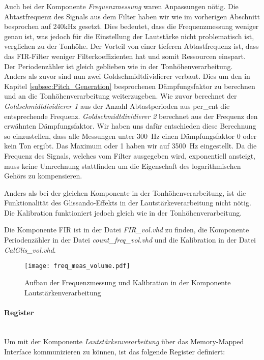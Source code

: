 Auch bei der Komponente \textit{Frequenzmessung} waren Anpassungen nötig. 
Die Abtastfrequenz des Signals aus dem Filter haben wir wie im vorherigen Abschnitt besprochen auf 240kHz gesetzt. Dies bedeutet, dass die Frequenzmessung weniger genau ist, was jedoch für die Einstellung der Lautstärke nicht problematisch ist, verglichen zu der Tonhöhe. Der Vorteil von einer tieferen Abtastfrequenz ist, dass das FIR-Filter weniger Filterkoeffizienten hat und somit Ressourcen einspart.\\
Der Periodenzähler ist gleich geblieben wie in der Tonhöhenverarbeitung.\\
Anders als zuvor sind nun zwei Goldschmidtdividierer verbaut. Dies um den in Kapitel \ref{subsec:Pitch_Generation} besprochenen Dämpfungsfaktor zu berechnen und an die Tonhöhenverarbeitung weiterzugeben. Wie zuvor berechnet der \textit{Goldschmidtdividierer 1} aus der Anzahl Abtastperioden aus per\_cnt die entsprechende Frequenz. \textit{Goldschmidtdividierer 2} berechnet aus der Frequenz den erwähnten Dämpfungsfaktor. Wir haben uns dafür entschieden diese Berechnung so einzustellen, dass alle Messungen unter \SI{300}{Hz} einen Dämpfungsfaktor 0 oder kein Ton ergibt. Das Maximum oder 1 haben wir auf \SI{3500}{Hz} eingestellt. Da die Frequenz des Signals, welches vom Filter ausgegeben wird, exponentiell ansteigt, muss keine Umrechnung stattfinden um die Eigenschaft des logarithmischen Gehörs zu kompensieren.

Anders als bei der gleichen Komponente in der Tonhöhenverarbeitung, ist die Funktionalität des Glissando-Effekts in der Lautstärkeverarbeitung nicht nötig. Die Kalibration funktioniert jedoch gleich wie in der Tonhöhenverarbeitung.

Die Komponente FIR ist in der Datei \textit{FIR\_vol.vhd} zu finden, die Komponente Periodenzähler in der Datei \textit{count\_freq\_vol.vhd} und die Kalibration in der Datei \textit{CalGlis\_vol.vhd}.

\begin{figure}[h!]
	\centering
	\texttt{[image: freq\_meas\_volume.pdf]}
	\caption{Aufbau der Frequenzmessung und Kalibration in der Komponente Lautstärkenverarbeitung} 
	\label{img:freq_meas_volume}
\end{figure}  

\newpage

\paragraph{Register}\mbox{}\\
Um mit der Komponente \textit{Lautstärkenverarbeitung} über das Memory-Mapped Interface kommunizieren zu können, ist das folgende Register definiert:



